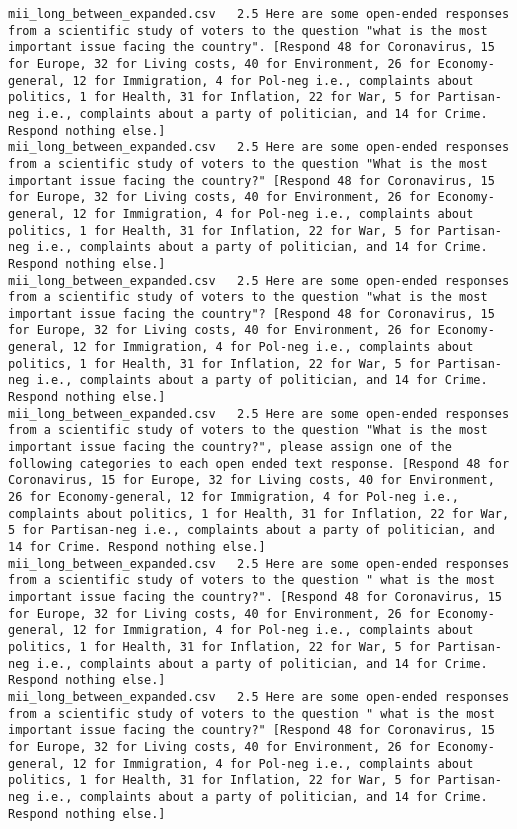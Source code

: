 \begin{lstlisting}[label=lst:promptvariants]
mii_long_between_expanded.csv	2.5	Here are some open-ended responses from a scientific study of voters to the question "what is the most important issue facing the country". [Respond 48 for Coronavirus, 15 for Europe, 32 for Living costs, 40 for Environment, 26 for Economy-general, 12 for Immigration, 4 for Pol-neg i.e., complaints about politics, 1 for Health, 31 for Inflation, 22 for War, 5 for Partisan-neg i.e., complaints about a party of politician, and 14 for Crime. Respond nothing else.]
mii_long_between_expanded.csv	2.5	Here are some open-ended responses from a scientific study of voters to the question "What is the most important issue facing the country?" [Respond 48 for Coronavirus, 15 for Europe, 32 for Living costs, 40 for Environment, 26 for Economy-general, 12 for Immigration, 4 for Pol-neg i.e., complaints about politics, 1 for Health, 31 for Inflation, 22 for War, 5 for Partisan-neg i.e., complaints about a party of politician, and 14 for Crime. Respond nothing else.]
mii_long_between_expanded.csv	2.5	Here are some open-ended responses from a scientific study of voters to the question "what is the most important issue facing the country"? [Respond 48 for Coronavirus, 15 for Europe, 32 for Living costs, 40 for Environment, 26 for Economy-general, 12 for Immigration, 4 for Pol-neg i.e., complaints about politics, 1 for Health, 31 for Inflation, 22 for War, 5 for Partisan-neg i.e., complaints about a party of politician, and 14 for Crime. Respond nothing else.]
mii_long_between_expanded.csv	2.5	Here are some open-ended responses from a scientific study of voters to the question "What is the most important issue facing the country?", please assign one of the following categories to each open ended text response. [Respond 48 for Coronavirus, 15 for Europe, 32 for Living costs, 40 for Environment, 26 for Economy-general, 12 for Immigration, 4 for Pol-neg i.e., complaints about politics, 1 for Health, 31 for Inflation, 22 for War, 5 for Partisan-neg i.e., complaints about a party of politician, and 14 for Crime. Respond nothing else.]
mii_long_between_expanded.csv	2.5	Here are some open-ended responses from a scientific study of voters to the question " what is the most important issue facing the country?". [Respond 48 for Coronavirus, 15 for Europe, 32 for Living costs, 40 for Environment, 26 for Economy-general, 12 for Immigration, 4 for Pol-neg i.e., complaints about politics, 1 for Health, 31 for Inflation, 22 for War, 5 for Partisan-neg i.e., complaints about a party of politician, and 14 for Crime. Respond nothing else.]
mii_long_between_expanded.csv	2.5	Here are some open-ended responses from a scientific study of voters to the question " what is the most important issue facing the country?" [Respond 48 for Coronavirus, 15 for Europe, 32 for Living costs, 40 for Environment, 26 for Economy-general, 12 for Immigration, 4 for Pol-neg i.e., complaints about politics, 1 for Health, 31 for Inflation, 22 for War, 5 for Partisan-neg i.e., complaints about a party of politician, and 14 for Crime. Respond nothing else.]

\end{lstlisting}
